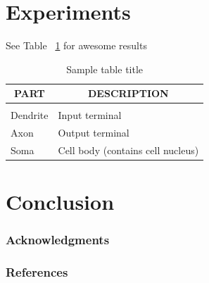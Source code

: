 \documentclass{article} %
\begin{document}
\section{Experiments}
See Table ~\ref{sample-table} for awesome results

\begin{table}[h]
\caption{Sample table title}
\label{sample-table}
\begin{center}
\begin{tabular}{ll}
\multicolumn{1}{c}{\bf PART}  &\multicolumn{1}{c}{\bf DESCRIPTION}
\\ \hline \\
Dendrite         &Input terminal \\
Axon             &Output terminal \\
Soma             &Cell body (contains cell nucleus) \\
\end{tabular}
\end{center}
\end{table}


\section{Conclusion}


\subsubsection*{Acknowledgments}



\subsubsection*{References}






\end{document}
